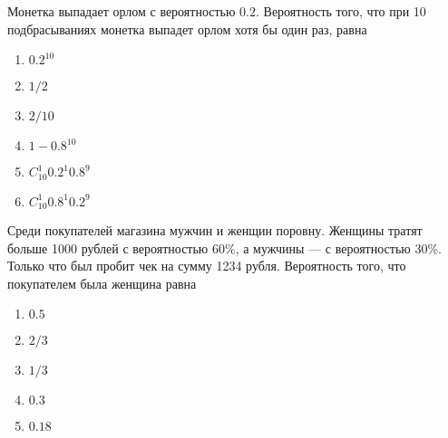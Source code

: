 \documentclass[t]{beamer}
\begin{document}
 \begin{frame} \label{7} 
\begin{block}{7} 

  Монетка выпадает орлом с вероятностью $0.2$. Вероятность того, что при 10 подбрасываниях монетка выпадет орлом хотя бы один раз, равна

 \end{block} 
\begin{enumerate} 
\item[] \hyperlink{7-No}{\beamergotobutton{} $0.2^10$}
\item[] \hyperlink{7-No}{\beamergotobutton{} $1/2$}
\item[] \hyperlink{7-No}{\beamergotobutton{} $2/10$}
\item[] \hyperlink{7-Yes}{\beamergotobutton{} $1 - 0.8^10$}
\item[] \hyperlink{7-No}{\beamergotobutton{} $C_{10}^1 0.2^{1}0.8^9$}
\item[] \hyperlink{7-No}{\beamergotobutton{} $C_{10}^1 0.8^{1}0.2^9$}
\end{enumerate} 
\end{frame} 


 \begin{frame} \label{8} 
\begin{block}{8} 

  Среди покупателей магазина мужчин и женщин поровну. Женщины тратят больше 1000 рублей с вероятностью 60\%, а мужчины — с вероятностью 30\%. Только что был пробит чек на сумму 1234 рубля. Вероятность того, что покупателем была женщина равна
  


 \end{block} 
\begin{enumerate} 
\item[] \hyperlink{8-No}{\beamergotobutton{} $0.5$}
\item[] \hyperlink{8-Yes}{\beamergotobutton{} $2/3$}
\item[] \hyperlink{8-No}{\beamergotobutton{} $1/3$}
\item[] \hyperlink{8-No}{\beamergotobutton{} $0.3$}
\item[] \hyperlink{8-No}{\beamergotobutton{} $0.18$}
\end{enumerate} 
\end{frame} 
\end{document}
